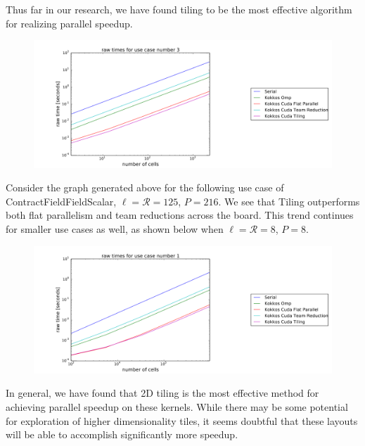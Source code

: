 Thus far in our research, we have found tiling to be the most effective algorithm for realizing parallel speedup. 

\begin{figure}
    \centering
\includegraphics[scale = .2]{tilinguc1}
\end{figure}
Consider the graph generated above for the following use case of ContractFieldFieldScalar, $\ell = \mathcal{R} = 125$, $P = 216$. We see that Tiling outperforms both flat parallelism and team reductions across the board. This trend continues for smaller use cases as well, as shown below when $\ell = \mathcal{R} = 8$, $P = 8$.

\begin{figure}[h]
    \centering
\includegraphics[scale = .2]{tilinguc2}
\end{figure}

In general, we have found that 2D tiling is the most effective method for achieving parallel speedup on these kernels. While there may be some potential for exploration of higher dimensionality tiles, it seems doubtful that these layouts will be able to accomplish significantly more speedup. 

